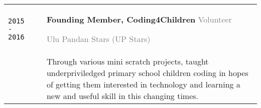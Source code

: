 \documentclass[11pt]{article}
\newcommand{\monoSp}[1]{{\usefont{T1}{rbtm}{m}{n} #1}}
\newcommand{\code}[1]{\monoSp{#1}}
\begin{document}
{\begin{tabularx}{\textwidth}{@{}l p{0.20cm} X @{}}
		\texttt{\large 2015 - 2016} %
		& & \textbf{Founding Member, Coding4Children} \hfill \textcolor{gray}{Volunteer} \par \textcolor{gray}{Ulu Pandan Stars {\footnotesize (UP Stars)}}\\[-0.5em]
		& & {\small Through various mini \code{scratch} projects, taught underpriviledged primary school children coding in hopes of getting them interested in technology and learning a new and useful skill in this changing times. }\\



\end{tabularx}}
\end{document}

